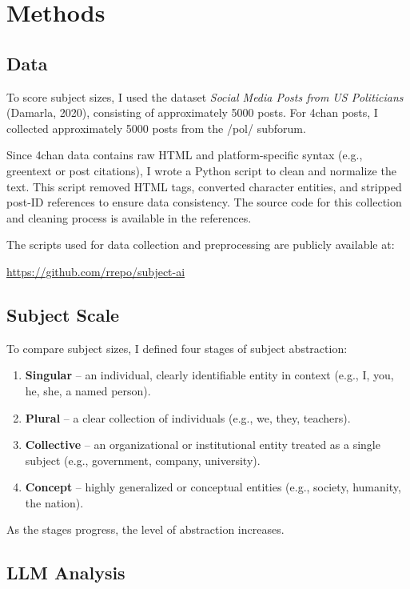 \documentclass{article}
\begin{document}
\section{Methods}

\subsection{Data}

To score subject sizes, I used the dataset \textit{Social Media Posts from US 
Politicians} (Damarla, 2020), consisting of approximately 5000 posts. 
For 4chan posts, I collected approximately 5000 posts from the /pol/ subforum.

Since 4chan data contains raw HTML and platform-specific syntax (e.g., greentext 
or post citations), I wrote a Python script to clean and normalize the text. 
This script removed HTML tags, converted character entities, and stripped 
post-ID references to ensure data consistency. The source code for this 
collection and cleaning process is available in the references.

The scripts used for data collection and preprocessing are publicly available at:

\url{https://github.com/rrepo/subject-ai}

\subsection{Subject Scale}

To compare subject sizes, I defined four stages of subject abstraction:

\begin{enumerate}
\item \textbf{Singular} – an individual, clearly identifiable entity in context 
(e.g., I, you, he, she, a named person).
\item \textbf{Plural} – a clear collection of individuals (e.g., we, they, teachers).
\item \textbf{Collective} – an organizational or institutional entity treated 
as a single subject (e.g., government, company, university).
\item \textbf{Concept} – highly generalized or conceptual entities 
(e.g., society, humanity, the nation).
\end{enumerate}

As the stages progress, the level of abstraction increases.

\subsection{LLM Analysis}
\end{document}
